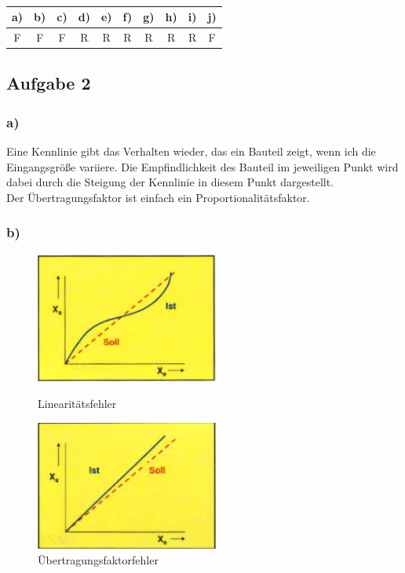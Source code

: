 \hfill\\

\begin{center}
\begin{tabular}{c|c|c|c|c|c|c|c|c|c}
a) & b) & c) & d) & e) & f) & g) & h) & i) & j) \\ 
\hline 
F & F & F & R & R & R & R & R & R & F \\ 
\end{tabular} 
\end{center}


\subsection{Aufgabe 2}

\subsubsection*{a)}

Eine Kennlinie gibt das Verhalten wieder, das ein Bauteil zeigt, wenn ich die Eingangsgröße variiere. Die Empfindlichkeit des Bauteil im jeweiligen Punkt wird dabei durch die Steigung der Kennlinie in diesem Punkt dargestellt. \\
Der Übertragungsfaktor ist einfach ein Proportionalitätsfaktor.


\subsubsection*{b)}

\begin{center}
    \begin{figure}[h]
        \begin{minipage}[hbt]{7cm}
            \includegraphics[width=6cm]{Kl112b_1.png}
            \caption{Linearitätsfehler}
        \end{minipage}
        \begin{minipage}[hbt]{7cm}
            \includegraphics[width=6cm]{Kl112b_2.png}
            \caption{Übertragungsfaktorfehler}
        \end{minipage}
    \end{figure}
\end{center}

